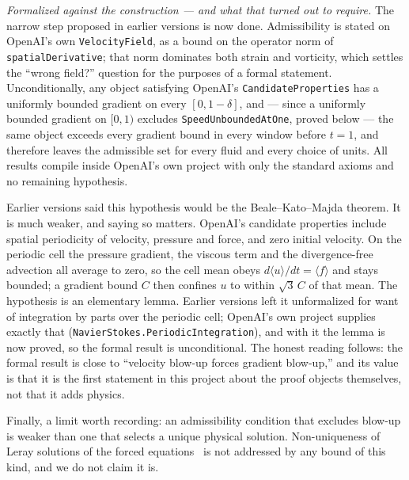 \documentclass[11pt,a4paper]{article}
\begin{document}
\emph{Formalized against the construction --- and what that turned out to require.} The narrow step
proposed in earlier versions is now done. Admissibility is stated on OpenAI's own
\texttt{VelocityField}, as a bound on the operator norm of \texttt{spatialDerivative}; that norm
dominates both strain and vorticity, which settles the ``wrong field?'' question for the purposes of a
formal statement. Unconditionally, any object satisfying OpenAI's \texttt{CandidateProperties} has a
uniformly bounded gradient on every $[0,1-\delta]$, and --- since a uniformly bounded gradient on
$[0,1)$ excludes \texttt{SpeedUnboundedAtOne}, proved below --- the same object exceeds every gradient
bound in every window before $t=1$, and therefore leaves the admissible set for every fluid and every
choice of units. All results compile inside OpenAI's own project with only the standard axioms and no
remaining hypothesis.

Earlier versions said this hypothesis would be the Beale--Kato--Majda theorem. It is much weaker,
and saying so matters. OpenAI's candidate properties include spatial periodicity of velocity,
pressure and force, and zero initial velocity. On the periodic cell the pressure gradient, the
viscous term and the divergence-free advection all average to zero, so the cell mean obeys
$d\langle u\rangle/dt=\langle f\rangle$ and stays bounded; a gradient bound $C$ then confines $u$ to
within $\sqrt3\,C$ of that mean. The hypothesis is an elementary lemma. Earlier versions left it
unformalized for want of integration by parts over the periodic cell; OpenAI's own project supplies
exactly that (\texttt{NavierStokes.PeriodicIntegration}), and with it the lemma is now proved, so the
formal result is unconditional.
The honest reading follows: the formal result is close to ``velocity blow-up forces gradient
blow-up,'' and its value is that it is the first statement in this project about the proof objects
themselves, not that it adds physics.

Finally, a limit worth recording: an admissibility condition that excludes blow-up is weaker than
one that selects a unique physical solution. Non-uniqueness of Leray solutions of the forced
equations~\cite{ABC2022} is not addressed by any bound of this kind, and we do not claim it is.
\end{document}
